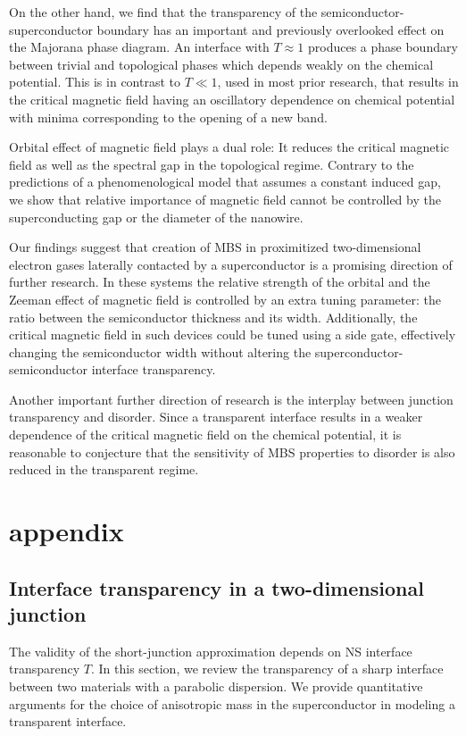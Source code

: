 On the other hand, we find that the transparency of the semiconductor-superconductor boundary has an important and previously overlooked effect on the Majorana phase diagram.
An interface with $T \approx 1$ produces a phase boundary between trivial and topological phases which depends weakly on the chemical potential.
This is in contrast to $T \ll 1$, used in most prior research, that results in the critical magnetic field having an oscillatory dependence on chemical potential with minima corresponding to the opening of a new band.

Orbital effect of magnetic field plays a dual role: It reduces the critical magnetic field as well as the spectral gap in the topological regime.
Contrary to the predictions of a phenomenological model that assumes a constant induced gap, we show that relative importance of magnetic field cannot be controlled by the superconducting gap or the diameter of the nanowire.

Our findings suggest that creation of MBS in proximitized two-dimensional electron gases laterally contacted by a superconductor is a promising direction of further research.
In these systems the relative strength of the orbital and the Zeeman effect of magnetic field is controlled by an extra tuning parameter: the ratio between the semiconductor thickness and its width.
Additionally, the critical magnetic field in such devices could be tuned using a side gate, effectively changing the semiconductor width without altering the superconductor-semiconductor interface transparency.

Another important further direction of research is the interplay between junction transparency and disorder.
Since a transparent interface results in a weaker dependence of the critical magnetic field on the chemical potential, it is reasonable to conjecture that the sensitivity of MBS properties to disorder is also reduced in the transparent regime.

\section{appendix}
\subsection{Interface transparency in a two-dimensional junction}
\label{sec:app}
The validity of the short-junction approximation depends on NS interface transparency $T$.
In this section, we review the transparency of a sharp interface between two materials with a parabolic dispersion.
We provide quantitative arguments for the choice of anisotropic mass in the superconductor in modeling a transparent interface.

